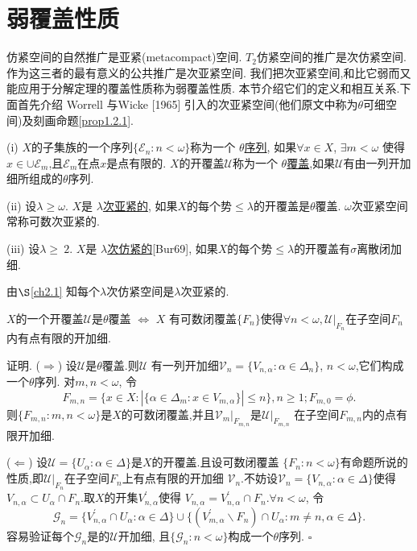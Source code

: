 \documentclass[main.tex]{subfiles}
\begin{document}
\section{弱覆盖性质}\label{ch1.2}
仿紧空间的自然推广是亚紧(metacompact)空间.
$T_2$仿紧空间的推广是次仿紧空间.
作为这三者的最有意义的公共推广是次亚紧空间.
我们把次亚紧空间,和比它弱而又能应用于分解定理的覆盖性质称为弱覆盖性质.
本节介绍它们的定义和相互关系.下面首先介绍 Worrell 与Wicke [1965] 引入的次亚紧空间(他们原文中称为$\theta$可细空间)及刻画命题\ref{prop1.2.1}.

\begin{definition}
\textnormal{(i)} $X$的子集族的一个序列$\{\mathscr{E}_n:n<\omega\}$称为一个
\underline{$\theta$序列},
如果$\forall x\in X$, $ \exists m < \omega$ 使得$x\in\cup \mathscr{E}_m$,且$\mathscr{E}_m$在点$x$是点有限的.
$X$的开覆盖$\mathscr{U}$称为一个 \underline{$\theta$覆盖},如果$\mathscr{U}$有由一列开加细所组成的$\theta$序列.

\textnormal{(ii)} 设$\lambda\ge\omega$. $X$是 \underline{$\lambda$次亚紧的},
如果$X$的每个势$\le\lambda$的开覆盖是$\theta$覆盖.
$\omega$次亚紧空间常称可数次亚紧的.


\textnormal{(iii)} 设$\lambda\ge\ 2$. $X$是 \underline{$\lambda$次仿紧的}\textnormal{[Bur69]},
如果$X$的每个势$\le\lambda$的开覆盖有$\sigma$离散闭加细.
\end{definition}

由$\S$\ref{ch2.1} 知每个$\lambda$次仿紧空间是$\lambda$次亚紧的.

\begin{proposition}\label{prop1.2.1}
$X$的一个开覆盖$\mathscr{U}$是$\theta$覆盖 $\Leftrightarrow$
$X$ 有可数闭覆盖$\{F_n\}$使得$\forall n < \omega, \mathscr{U}|_{F_n}$在子空间${F_n}$内有点有限的开加细.
\end{proposition}

证明. ($\Rightarrow$) 设$\mathscr{U}$是$\theta$覆盖.则$\mathscr{U}$
有一列开加细$\mathscr{V}_n = \{V_{n, \alpha}: \alpha\in \Delta_n\}$,
$n<\omega$,它们构成一个$\theta$序列.
对$m,n<\omega$, 令
$$F_{m,n}=\{x\in X: |\{\alpha\in\Delta_m: x\in V_{m,\alpha}\}|\le n\}, n\ge 1; F_{m,0} = \phi.$$
则$\{F_{m,n}:m,n<\omega\}$是$X$的可数闭覆盖,并且$\mathscr{V}_m|_{F_{m,n}}$是$\mathscr{U}|_{F_{m,n}}$
在子空间$F_{m,n}$内的点有限开加细.

($\Leftarrow$) 设$\mathscr{U} = \{ U_\alpha: \alpha\in\Delta\}$是$X$的开覆盖.且设可数闭覆盖
$\{F_n:n<\omega\}$有命题所说的性质,即$\mathscr{U}|_{F_n}$在子空间$F_n$上有点有限的开加细
$\mathscr{V}_n$.不妨设$\mathscr{V}_n=\{V_{n,\alpha}:\alpha\in\Delta\}$使得
$V_{n,\alpha}\subset U_\alpha\cap F_n$.取$X$的开集$V_{n,\alpha}^\prime$使得
$V_{n,\alpha}=V_{n,\alpha}^\prime\cap F_n$.$\forall n<\omega$, 令
$$\mathscr{G}_n=\{V_{n,\alpha}^\prime\cap U_\alpha:\alpha\in\Delta\}
\cup\{(V_{m,\alpha}^\prime\backslash F_n)\cap U_\alpha: m\ne n, \alpha\in\Delta\}.$$
容易验证每个$\mathscr{G}_n$是的$\mathscr{U}$开加细,
且$\{\mathscr{G}_n:n<\omega\}$构成一个$\theta$序列.  $\square$
\end{document}
